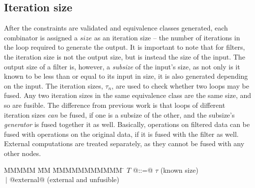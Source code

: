 % 




\subsection{Iteration size}
After the constraints are validated and equivalence classes generated, each combinator is assigned a $size$ as an iteration size -- the number of iterations in the loop required to generate the output.
It is important to note that for filters, the iteration size is not the output size, but is instead the size of the input.
The output size of a filter is, however, a \emph{subsize} of the input's size, as not only is it known to be less than or equal to its input in size, it is also generated depending on the input.
The iteration sizes, $\tau_n$, are used to check whether two loops may be fused.
Any two iteration sizes in the same equivalence class are the same size, and so are fusible.
The difference from previous work is that loops of different iteration sizes \emph{can} be fused, if one is a subsize of the other, and the subsize's \emph{generator} is fused together it as well.
Basically, operations on filtered data can be fused with operations on the original data, if it is fused with the filter as well.
External computations are treated separately, as they cannot be fused with any other nodes.

\begin{tabbing}
MMMMM       \= MM \= MMMMMMMMMMM \= \kill
$T$          \> @::=@ \> $\tau$                                  \> (known size) \\
             \> $~|$  \> @external@                              \> (external and unfusible) \\
\end{tabbing}


